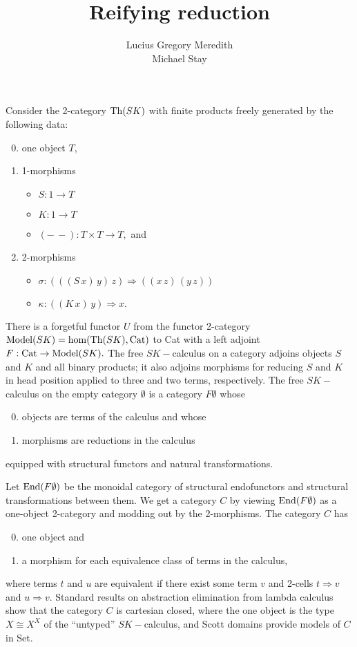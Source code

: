 \documentclass[11pt]{article}
\newcommand{\maps}{\colon}
\newcommand{\Th}{{\rm Th}}
\newcommand{\Cat}{{\rm Cat}}
\newcommand{\End}{{\rm End}}
\newcommand{\Model}{{\rm Model}}
\begin{document}
 
\title{Reifying reduction}
\author{Lucius Gregory Meredith\\Michael Stay}
\date{}
\maketitle

Consider the 2-category $\Th(SK)$ with finite products freely generated by the following data:
\begin{enumerate}
  \setcounter{enumi}{-1}
  \item one object $T$,
  \item 1-morphisms
    \begin{itemize}
      \item $S\maps 1 \to T$
      \item $K\maps 1 \to T$
      \item $(-\, -)\maps T \times T \to T,$ and
    \end{itemize}
  \item 2-morphisms
    \begin{itemize}
      \item $\sigma\maps (((S\, x)\, y)\, z) \Rightarrow ((x\, z)\, (y\, z))$
      \item $\kappa\maps ((K\, x)\, y) \Rightarrow x.$
    \end{itemize}
\end{enumerate}

There is a forgetful functor $U$ from the functor 2-category $\Model(SK) = \hom(\Th(SK), \Cat)$ to Cat with a left adjoint $F:\Cat \to \Model(SK).$  The free $SK-$calculus on a category adjoins objects $S$ and $K$ and all binary products; it also adjoins morphisms for reducing $S$ and $K$ in head position applied to three and two terms, respectively.  The free $SK-$calculus on the empty category $\emptyset$ is a category $F\emptyset$ whose 
\begin{enumerate}
  \setcounter{enumi}{-1}
  \item objects are terms of the calculus and whose
  \item morphisms are reductions in the calculus
\end{enumerate}
equipped with structural functors and natural transformations.  

Let $\End(F\emptyset)$ be the monoidal category of structural endofunctors and structural transformations between them.  We get a category $C$ by viewing $\End(F\emptyset)$ as a one-object 2-category and modding out by the 2-morphisms.  The category $C$ has
\begin{enumerate}
  \setcounter{enumi}{-1}
  \item one object and
  \item a morphism for each equivalence class of terms in the calculus,
\end{enumerate}
where terms $t$ and $u$ are equivalent if there exist some term $v$ and 2-cells $t\Rightarrow v$ and $u\Rightarrow v$.  Standard results on abstraction elimination from lambda calculus show that the category $C$ is cartesian closed, where the one object is the type $X \cong X^X$ of the ``untyped'' $SK-$calculus, and Scott domains provide models of $C$ in Set.
\end{document}
